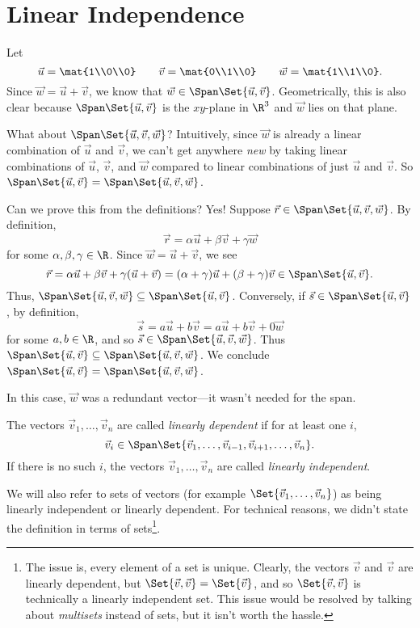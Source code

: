 \section{Linear Independence}

Let
\[
	\vec u=\mat{1\\0\\0}\qquad\vec v=\mat{0\\1\\0}\qquad \vec w=\mat{1\\1\\0}.
\]
Since $\vec w=\vec u+\vec v$, we know that $\vec w\in\Span\Set{\vec u,\vec v}$. Geometrically,
this is also clear because $\Span\Set{\vec u,\vec v}$ is the $xy$-plane in $\R^3$ and 
$\vec w$ lies on that plane.

What about $\Span\Set{\vec u,\vec v,\vec w}$? Intuitively, since $\vec w$ is already
a linear combination of $\vec u$ and $\vec v$, we can't get anywhere \emph{new} by
taking linear combinations of $\vec u$, $\vec v$, and $\vec w$ compared to linear combinations
of just $\vec u$ and $\vec v$. So $\Span\Set{\vec u,\vec v}=\Span\Set{\vec u,\vec v,\vec w}$.

Can we prove this from the definitions? Yes! Suppose $\vec r\in \Span\Set{\vec u,\vec v,\vec w}$.
By definition,
\[
	\vec r=\alpha\vec u+\beta\vec v+\gamma\vec w
\] for some $\alpha,\beta,\gamma\in\R$. Since $\vec w=\vec u+\vec v$, we see
\[
	\vec r=\alpha\vec u+\beta\vec v+\gamma(\vec u+\vec v) 
	= (\alpha+\gamma)\vec u+(\beta+\gamma)\vec v\in\Span\Set{\vec u,\vec v}.
\]
Thus, $\Span\Set{\vec u,\vec v,\vec w}\subseteq \Span\Set{\vec u,\vec v}$. Conversely, if $\vec s\in\Span\Set{\vec u,\vec v}$,
by definition,
\[
	\vec s=a\vec u+b\vec v=a\vec u+b\vec v+0\vec w
\]
for some $a,b\in \R$,
and so $\vec s\in\Span\Set{\vec u,\vec v,\vec w}$. Thus $\Span\Set{\vec u,\vec v}\subseteq\Span\Set{\vec u,\vec v,\vec w}$.
We conclude $\Span\Set{\vec u,\vec v}=\Span\Set{\vec u,\vec v,\vec w}$.

In this case, $\vec w$ was a redundant vector---it wasn't needed for the span.


\begin{definition}
	\label{DEFLININD}
	The vectors $\vec v_1,\ldots,\vec v_n$ are called \emph{linearly dependent} if 
	for at least one $i$, 
	\[
		\vec v_i \in \Span\Set{\vec v_1,\ldots,\vec v_{i-1},\vec v_{i+1},\ldots,\vec v_n}.
	\]
	If there is no such $i$, the vectors $\vec v_1,\ldots,\vec v_n$ are called \emph{linearly
	independent}.
\end{definition}
We will also refer to sets of vectors (for example $\Set{\vec v_1,\ldots,\vec v_n}$) as being linearly
independent or linearly dependent. For technical reasons, we didn't state the definition in terms
of sets\footnote{ The issue is, every element of a set is unique. Clearly, the vectors $\vec v$ and $\vec v$
are linearly dependent, but $\Set{\vec v,\vec v}=\Set{\vec v}$, and so $\Set{\vec v,\vec v}$ is technically
a linearly independent set. This issue would be resolved by talking about \emph{multisets} instead of sets,
but it isn't worth the hassle.}.

